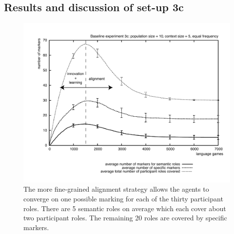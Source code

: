 \subsection{Results and discussion of set-up 3c}

\begin{figure}[t]
\centerline{\includegraphics[width=\textwidth]{Chapter3/figs/graph-base3-size3c}}
  \caption[Baseline experiment 3c: number of markers]{The more fine-grained alignment strategy allows the agents to converge on one possible marking for each of the thirty participant roles. There are 5 semantic roles on average which each cover about two participant roles. The remaining 20 roles are covered by specific markers.}
   \label{f:base3-size3c}
\end{figure}

